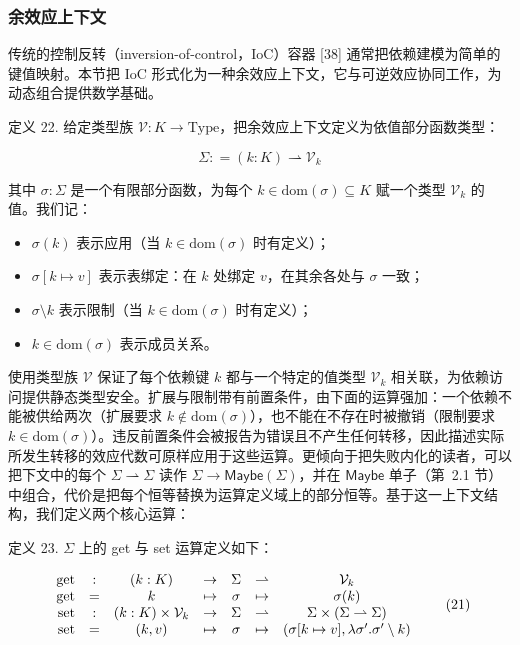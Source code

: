 \documentclass[
  10
]{article}
\begin{document}
\subsubsection{余效应上下文} \label{coefect-context}

传统的控制反转（inversion-of-control，IoC）容器 {[}38{]} 通常把依赖建模为简单的键值映射。本节把 IoC 形式化为一种余效应上下文，它与可逆效应协同工作，为动态组合提供数学基础。

定义 22. 给定类型族 \(\mathcal { V } : K \to \mathrm { T y p e }\)，把余效应上下文定义为依值部分函数类型：

\[
\Sigma : = ( k : K ) \rightharpoonup \mathcal { V } _ { k }\tag{20}
\]

其中 \(\sigma : \Sigma\) 是一个有限部分函数，为每个 \(k \in \mathrm { d o m } ( \sigma ) \subseteq K\) 赋一个类型 \(\mathcal { V } _ { k }\) 的值。我们记：

\begin{itemize}
\item \(\sigma ( k )\) 表示应用（当 \(k \in \mathrm { d o m } ( \sigma )\) 时有定义）；
\item \(\sigma [ k \mapsto v ]\) 表示表绑定：在 \(k\) 处绑定 \(v\)，在其余各处与 \(\sigma\) 一致；
\item \(\sigma \setminus k\) 表示限制（当 \(k \in \mathrm { d o m } ( \sigma )\) 时有定义）；
\item \(k \in \mathrm { d o m } ( \sigma )\) 表示成员关系。
\end{itemize}

使用类型族 \(\mathcal { V }\) 保证了每个依赖键 \(k\) 都与一个特定的值类型 \(\mathcal { V } _ { k }\) 相关联，为依赖访问提供静态类型安全。扩展与限制带有前置条件，由下面的运算强加：一个依赖不能被供给两次（扩展要求 \(k \notin \mathrm { d o m } ( \sigma )\)），也不能在不存在时被撤销（限制要求 \(k \in \mathrm { d o m } ( \sigma )\)）。违反前置条件会被报告为错误且不产生任何转移，因此描述实际所发生转移的效应代数可原样应用于这些运算。更倾向于把失败内化的读者，可以把下文中的每个 \(\Sigma \rightharpoonup \Sigma\) 读作 \(\Sigma \to \mathsf { Maybe } ( \Sigma )\)，并在 \(\mathsf { Maybe }\) 单子（第~2.1 节）中组合，代价是把每个恒等替换为运算定义域上的部分恒等。基于这一上下文结构，我们定义两个核心运算：

定义 23. \(\Sigma\) 上的 get 与 set 运算定义如下：

\[
\begin{array} { r c c c c c c } { \mathrm { g e t } } & { : } & { ( k : K ) } & { \to } & { \Sigma } & { \rightharpoonup } & { \mathcal { V } _ { k } } \\ { \mathrm { g e t } } & { = } & { k } & { \mapsto } & { \sigma } & { \mapsto } & { \sigma ( k ) } \\ { \mathrm { s e t } } & { : } & { ( k : K ) \times \mathcal { V } _ { k } } & { \to } & { \Sigma } & { \rightharpoonup } & { \Sigma \times ( \Sigma \rightharpoonup \Sigma ) } \\ { \mathrm { s e t } } & { = } & { ( k , v ) } & { \mapsto } & { \sigma } & { \mapsto } & { ( \sigma [ k \mapsto v ] , \lambda \sigma ^ { \prime } . \sigma ^ { \prime } \setminus k ) } \end{array}\tag{21}
\]
\end{document}
